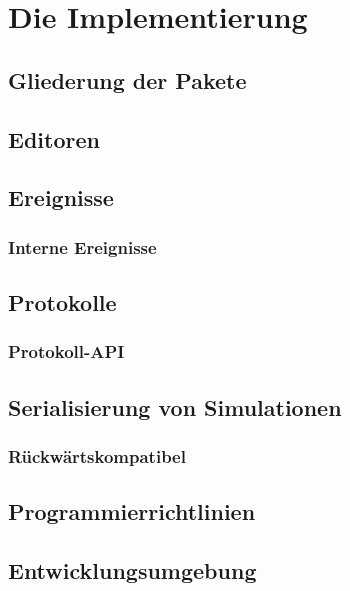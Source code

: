 \chapter{Die Implementierung}

\section{Gliederung der Pakete}

\section{Editoren}

\section{Ereignisse}

\subsection{Interne Ereignisse}

\section{Protokolle}

\subsection{Protokoll-API}

\section{Serialisierung von Simulationen}

\subsection{R\"{u}ckw\"{a}rtskompatibel}

\section{Programmierrichtlinien}

\section{Entwicklungsumgebung}

